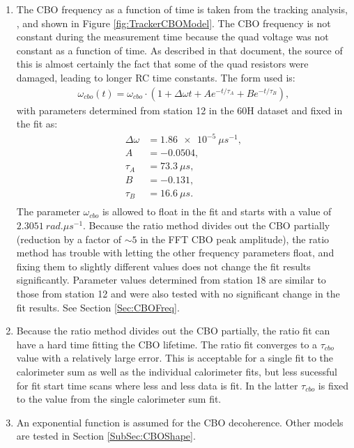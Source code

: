 	\begin{enumerate}
		\item{The CBO frequency as a function of time is taken from the tracking analysis, , and shown in Figure \ref{fig:TrackerCBOModel}. The CBO frequency is not constant during the measurement time because the quad voltage was not constant as a function of time. As described in that document, the source of this is almost certainly the fact that some of the quad resistors were damaged, leading to longer RC time constants. The form used is:
			\begin{gather}
				\omega_{cbo}(t) = \omega_{cbo} \cdot (1 + \Delta\omega t + A e^{-t/\tau_{A}} + B e^{-t/\tau_{B}}),
			\label{Eqn:CBOFreq}
			\end{gather}
		with parameters determined from station 12 in the 60H dataset and fixed in the fit as:
			\begin{equation*}	
			\begin{aligned}
			 	\Delta\omega &= \SI{1.86e-5}{\mu s^{-1}}, \\
			 	A &= -0.0504, \\
			 	\tau_{A} &= \SI{73.3}{\mu s}, \\
			 	B &= -0.131, \\
			 	\tau_{B} &= \SI{16.6}{\mu s}. \\
			\end{aligned}
			\end{equation*}
		The parameter $\omega_{cbo}$ is allowed to float in the fit and starts with a value of $\SI{2.3051}{rad.\mu s^{-1}}$. Because the ratio method divides out the CBO partially (reduction by a factor of $\sim5$ in the FFT CBO peak amplitude), the ratio method has trouble with letting the other frequency parameters float, and fixing them to slightly different values does not change the fit results significantly. Parameter values determined from station 18 are similar to those from station 12 and were also tested with no significant change in the fit results. See Section \ref{Sec:CBOFreq}.}
		\item{Because the ratio method divides out the CBO partially, the ratio fit can have a hard time fitting the CBO lifetime. The ratio fit converges to a $\tau_{cbo}$ value with a relatively large error. This is acceptable for a single fit to the calorimeter sum as well as the individual calorimeter fits, but less sucessful for fit start time scans where less and less data is fit. In the latter $\tau_{cbo}$ is fixed to the value from the single calorimeter sum fit.}
		\item{An exponential function is assumed for the CBO decoherence. Other models are tested in Section \ref{SubSec:CBOShape}.}

\end{enumerate}
